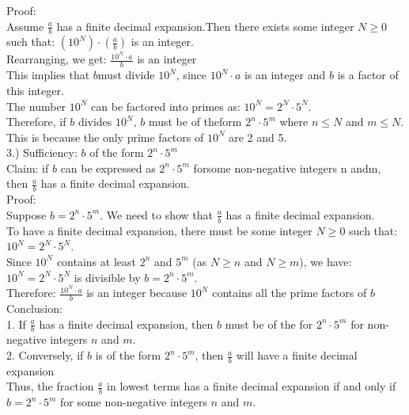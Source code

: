 \documentclass{article}
\begin{document}
Proof:\\

Assume $\frac{a}{b}$ has a finite decimal expansion.Then there exists some integer $N \geq 0$ such that: $(10^N) \cdot (\frac{a}{b})$ is an integer.\\

Rearranging, we get: $\frac{10^N \cdot a}{b}$ is an integer\\

This implies that $b$must divide $10^N$, since $10^N \cdot a$ is an integer and $b$ is a factor of this integer.\\

The number $10^N$ can be factored into primes as: $10^N = 2^N \cdot 5^N$.\\

Therefore, if $b$ divides $10^N$, $b$ must be of theform $2^n \cdot 5^m$ where $n \leq N$ and $m \leq N$. This is because the only prime factors of $10^N$ are 2 and 5.\\

3.)  Sufficiency: $b$ of the form $2^n \cdot 5^m$\\

Claim: if $b$ can be expressed as $2^n \cdot 5^m$ forsome non-negative integers n andm, then $\frac{a}{b}$ has a finite decimal expansion.\\

Proof:\\

Suppose $b = 2^n \cdot 5^m$. We need to show that $\frac{a}{b}$ has a finite decimal expansion.\\

To have a finite decimal expansion, there must be some integer $N \geq 0$ such that: $10^N = 2^N \cdot 5^N$.\\

Since $10^N$ contains at least $2^n$ and $5^m$ (as $N \geq n$ and $N \geq m$), we have: $10^N = 2^N \cdot 5^N$ is divisible by $b = 2^n \cdot 5^m$.\\

Therefore: $\frac{10^N \cdot a}{b}$ is an integer because $10^N$ contains all the prime factors of $b$\\

Conclusion: \\

1. If $\frac{a}{b}$ has a finite decimal expansion, then $b$ must be of the for $2^n \cdot 5^m$ for non-negative integers $n$ and $m$.\\
2. Conversely, if $b$ is of the form $2^n \cdot 5^m$, then $\frac{a}{b}$ will have a finite decimal expansion\\

Thus, the fraction $\frac{a}{b}$ in lowest terms has a finite decimal expansion if and only if $b = 2^n \cdot 5^m$ for some non-negative integers $n$ and $m$.
\end{document}
